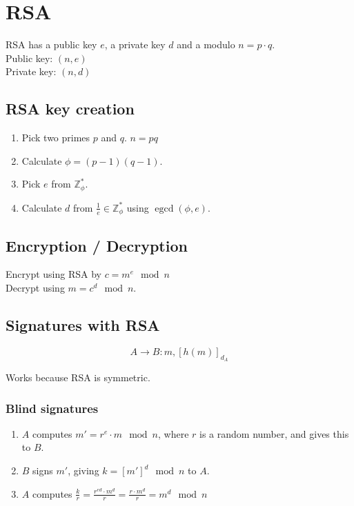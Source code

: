\documentclass{article}
\newcommand{\Z}{\mathbb{Z}}
\newcommand{\egcd}{\operatorname{egcd}}
\begin{document}
\section{RSA}

RSA has a public key $e$, a private key $d$ and a modulo $n=p\cdot q$. \\
Public key: $(n, e)$\\
Private key: $(n,d)$ \\

\subsection{RSA key creation}
\begin{enumerate}
  \item Pick two primes $p$ and $q$. $n=pq$
  \item Calculate $\phi = (p-1)(q-1)$.
  \item Pick $e$ from $\Z^*_\phi$.
  \item Calculate $d$ from $\frac{1}{e} \in \Z^*_\phi$ using $\egcd(\phi,e)$.
\end{enumerate}

\subsection{Encryption / Decryption}
Encrypt using RSA by $c = m^e \mod n$\\
Decrypt using $m = c^d \mod n$.

\subsection{Signatures with RSA}

\[
  A \longrightarrow B : m, [h(m)]_{d_A}
\]

Works because RSA is symmetric.

\subsubsection{Blind signatures}

\begin{enumerate}
  \item $A$ computes $m' = r^e \cdot m \mod n$, where $r$ is a random number, and gives
    this to $B$.
  \item $B$ signs $m'$, giving $k = [m']^d \mod n$ to $A$.
  \item $A$ computes $\frac{k}{r} = \frac{r^{ed} \cdot m^d}{r} = \frac{r \cdot m^d}{r} = m^d \mod n$
\end{enumerate}
\end{document}
